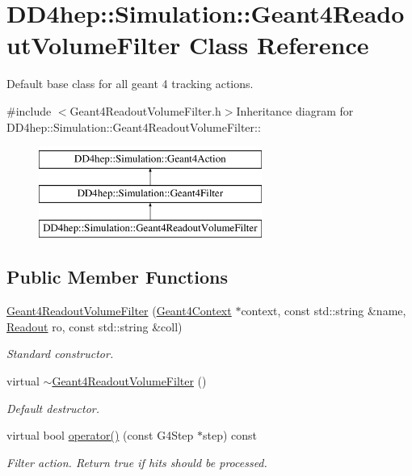 \hypertarget{class_d_d4hep_1_1_simulation_1_1_geant4_readout_volume_filter}{
\section{DD4hep::Simulation::Geant4ReadoutVolumeFilter Class Reference}
\label{class_d_d4hep_1_1_simulation_1_1_geant4_readout_volume_filter}
}


Default base class for all geant 4 tracking actions.  


{\ttfamily \#include $<$Geant4ReadoutVolumeFilter.h$>$}Inheritance diagram for DD4hep::Simulation::Geant4ReadoutVolumeFilter::\begin{figure}[H]
\begin{center}
\leavevmode
\includegraphics[height=3cm]{class_d_d4hep_1_1_simulation_1_1_geant4_readout_volume_filter}
\end{center}
\end{figure}
\subsection*{Public Member Functions}
\begin{DoxyCompactItemize}
\item 
\hyperlink{class_d_d4hep_1_1_simulation_1_1_geant4_readout_volume_filter_a459197d17e4baedd3d1147e4def0aea9}{Geant4ReadoutVolumeFilter} (\hyperlink{class_d_d4hep_1_1_simulation_1_1_geant4_context}{Geant4Context} $\ast$context, const std::string \&name, \hyperlink{class_d_d4hep_1_1_geometry_1_1_readout}{Readout} ro, const std::string \&coll)
\begin{DoxyCompactList}\small\item\em Standard constructor. \item\end{DoxyCompactList}\item 
virtual \hyperlink{class_d_d4hep_1_1_simulation_1_1_geant4_readout_volume_filter_a36b9e4aa16116e85f3635ac891c60972}{$\sim$Geant4ReadoutVolumeFilter} ()
\begin{DoxyCompactList}\small\item\em Default destructor. \item\end{DoxyCompactList}\item 
virtual bool \hyperlink{class_d_d4hep_1_1_simulation_1_1_geant4_readout_volume_filter_a95a43710204f164feed508114dffb548}{operator()} (const G4Step $\ast$step) const 
\begin{DoxyCompactList}\small\item\em Filter action. Return true if hits should be processed. \item\end{DoxyCompactList}\end{DoxyCompactItemize}
